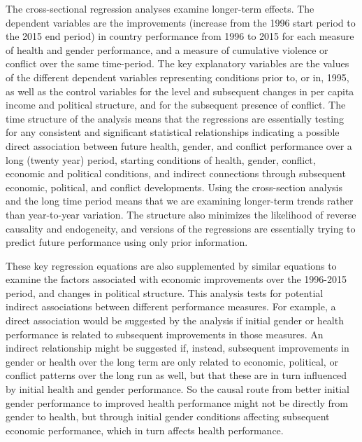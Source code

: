 \documentclass[12pt]{article}
\begin{document}
The cross-sectional regression analyses examine longer-term effects.
The dependent variables are the improvements (increase from the 1996 start period to the 2015 end period) in country performance from 1996 to 2015 for each measure of health and gender performance, and a measure of cumulative violence or conflict over the same time-period.
The key explanatory variables are the values of the different dependent variables representing conditions prior to, or in, 1995, as well as the control variables for the level and subsequent changes in per capita income and political structure, and for the subsequent presence of conflict. The time structure of the analysis means that the regressions are essentially testing for any consistent and significant statistical relationships indicating a possible direct association between future health, gender, and conflict performance over a long (twenty year) period, starting conditions of health, gender, conflict, economic and political conditions, and indirect connections through subsequent economic, political, and conflict developments. Using the cross-section analysis and the long time period means that we are examining longer-term trends rather than year-to-year variation. The structure also minimizes the likelihood of reverse causality and endogeneity, and versions of the regressions are essentially trying to predict future performance using only prior information.

These key regression equations are also supplemented by similar equations to examine the factors associated with economic improvements over the 1996-2015 period, and changes in political structure. This analysis tests for potential indirect associations between different performance measures. For example, a direct association would be suggested by the analysis if initial gender or health performance is related to subsequent improvements in those measures. An indirect relationship might be suggested if, instead, subsequent improvements in gender or health over the long term are only related to economic, political, or conflict patterns over the long run as well, but that these are in turn influenced by initial health and gender performance. So the causal route from better initial gender performance to improved health performance might not be directly from gender to health, but through initial gender conditions affecting subsequent economic performance, which in turn affects health performance.
\end{document}
